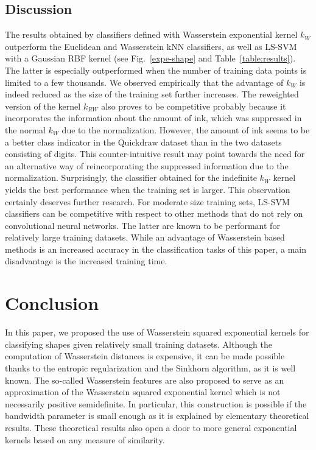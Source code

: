 \subsection{Discussion}
The results obtained by classifiers defined with Wasserstein exponential kernel $k_W$ outperform the Euclidean and Wasserstein kNN classifiers, as well as LS-SVM with a Gaussian RBF kernel (see Fig.~\ref{expe-shape} and Table~\ref{table:results}). The latter is especially outperformed when the number of training data points is limited to a few thousands. We observed empirically that the advantage of $k_W$ is indeed reduced as the size of the training set further increases. The reweighted version of the kernel $k_{RW}$ also proves to be competitive probably because it incorporates the information about the amount of ink, which was suppressed in the normal $k_W$ due to the normalization. However, the amount of ink seems to be a better class indicator in the Quickdraw dataset than in the two datasets consisting of digits. This counter-intuitive result may point towards the need for an alternative way of reincorporating the suppressed information due to the normalization.
Surprisingly, the classifier obtained for the indefinite $k_W$ kernel yields the best performance when the training set is larger. This observation certainly deserves further research. For moderate size training sets, LS-SVM classifiers can be competitive with respect to other methods that do not rely on convolutional neural networks. The latter are known to be performant for relatively large training datasets.
While an advantage of Wasserstein based methods is an increased accuracy in the classification tasks of this paper, a main disadvantage is the increased training time.


\section{Conclusion}
In this paper, we proposed the use of Wasserstein squared exponential kernels for classifying shapes given relatively small training datasets. Although the computation of Wasserstein distances is expensive, it can be made possible thanks to the entropic regularization and the Sinkhorn algorithm, as it is well known. The so-called Wasserstein features are also proposed to serve as an approximation of the Wasserstein squared exponential kernel which is not necessarily positive semidefinite. In particular, this construction is possible if the bandwidth parameter is small enough as it is explained by elementary theoretical results. These theoretical results also open a door to more general exponential kernels based on any measure of similarity.